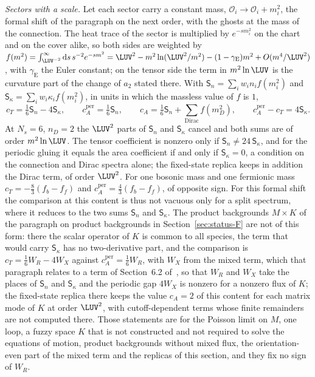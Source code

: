 \emph{Sectors with a scale.} Let each sector carry a constant mass, \(\mathcal O_i\to\mathcal O_i+m_i^2\), the formal shift of the paragraph on the next order, with the ghosts at the mass of the connection. The heat trace of the sector is multiplied by \(e^{-sm_i^2}\) on the chart and on the cover alike, so both sides are weighted by \(f(m^2)=\int_{\LUV^{-2}}^\infty\mathrm ds\,s^{-2}e^{-sm^2}=\LUV^2-m^2\ln(\LUV^2/m^2)-(1-\gamma_{\mathrm E})m^2+O(m^4/\LUV^2)\), with \(\gamma_{\mathrm E}\) the Euler constant; on the tensor side the term in \(m^2\ln\LUV\) is the curvature part of the change of \(a_2\) stated there. With \(\mathsf S_n=\sum_iw_in_if(m_i^2)\) and \(\mathsf S_\kappa=\sum_iw_i\kappa_if(m_i^2)\), in units in which the massless value of \(f\) is \(1\),
\[
  c_T=\tfrac16\mathsf S_n-4\mathsf S_\kappa,\qquad c_A^{\mathrm{per}}=\tfrac16\mathsf S_n,\qquad c_A=\tfrac16\mathsf S_n+\sum_{\text{Dirac}}f(m_D^2),\qquad c_A^{\mathrm{per}}-c_T=4\mathsf S_\kappa .
\]
At \(N_s=6\), \(n_D=2\) the \(\LUV^2\) parts of \(\mathsf S_n\) and \(\mathsf S_\kappa\) cancel and both sums are of order \(m^2\ln\LUV\). The tensor coefficient is nonzero only if \(\mathsf S_n\neq24\,\mathsf S_\kappa\), and for the periodic gluing it equals the area coefficient if and only if \(\mathsf S_\kappa=0\), a condition on the connection and Dirac spectra alone; the fixed-state replica keeps in addition the Dirac term, of order \(\LUV^2\). For one bosonic mass and one fermionic mass \(c_T=-\tfrac83(f_b-f_f)\) and \(c_A^{\mathrm{per}}=\tfrac43(f_b-f_f)\), of opposite sign. For this formal shift the comparison at this content is thus not vacuous only for a split spectrum, where it reduces to the two sums \(\mathsf S_n\) and \(\mathsf S_\kappa\). The product backgrounds \(M\times K\) of the paragraph on product backgrounds in Section~\ref{sec:status-F} are not of this form: there the scalar operator of \(K\) is common to all species, the term that would carry \(\mathsf S_\kappa\) has no two-derivative part, and the comparison is \(c_T=\tfrac16W_R-4W_X\) against \(c_A^{\mathrm{per}}=\tfrac16W_R\), with \(W_X\) from the mixed term, which that paragraph relates to a term of Section~6.2 of~\cite{Steinacker2023}, so that \(W_R\) and \(W_X\) take the places of \(\mathsf S_n\) and \(\mathsf S_\kappa\) and the periodic gap \(4W_X\) is nonzero for a nonzero flux of \(K\); the fixed-state replica there keeps the value \(c_A=2\) of this content for each matrix mode of \(K\) at order \(\LUV^2\), with cutoff-dependent terms whose finite remainders are not computed there. Those statements are for the Poisson limit on \(M\), one loop, a fuzzy space \(K\) that is not constructed and not required to solve the equations of motion, product backgrounds without mixed flux, the orientation-even part of the mixed term and the replicas of this section, and they fix no sign of \(W_R\).

